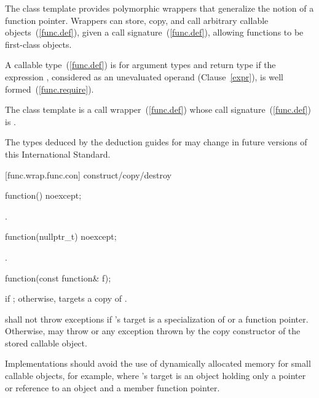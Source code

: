 \pnum
The  class template provides polymorphic wrappers that
generalize the notion of a function pointer. Wrappers can store, copy,
and call arbitrary callable objects~(\ref{func.def}), given a call
signature~(\ref{func.def}), allowing functions to be first-class objects.

\pnum
{}%
A callable type~(\ref{func.def}) 
is  for argument
types 
and return type 
if the expression
,
considered as an unevaluated operand (Clause~\ref{expr}), is
well formed~(\ref{func.require}).

\pnum
The  class template is a call
wrapper~(\ref{func.def}) whose call signature~(\ref{func.def})
is .

\pnum
\begin{note}
The types deduced by the deduction guides for 
may change in future versions of this International Standard.
\end{note}

[func.wrap.func.con]{ construct/copy/destroy}

%
\begin{itemdecl}
function() noexcept;
\end{itemdecl}

\begin{itemdescr}
\pnum\postconditions {}.
\end{itemdescr}

%
\begin{itemdecl}
function(nullptr_t) noexcept;
\end{itemdecl}

\begin{itemdescr}
\pnum
\postconditions {}.
\end{itemdescr}

%
\begin{itemdecl}
function(const function& f);
\end{itemdecl}

\begin{itemdescr}
\pnum
\postconditions {} if ; otherwise,
 targets a copy of .

\pnum
\throws shall not throw exceptions if 's target is
a specialization of  or
a function pointer. Otherwise, may throw 
or any exception thrown by the copy constructor of the stored callable object.
\begin{note} Implementations should avoid the use of
dynamically allocated memory for small callable objects, for example, where
's target is an object holding only a pointer or reference
to an object and a member function pointer. \end{note}
\end{itemdescr}

